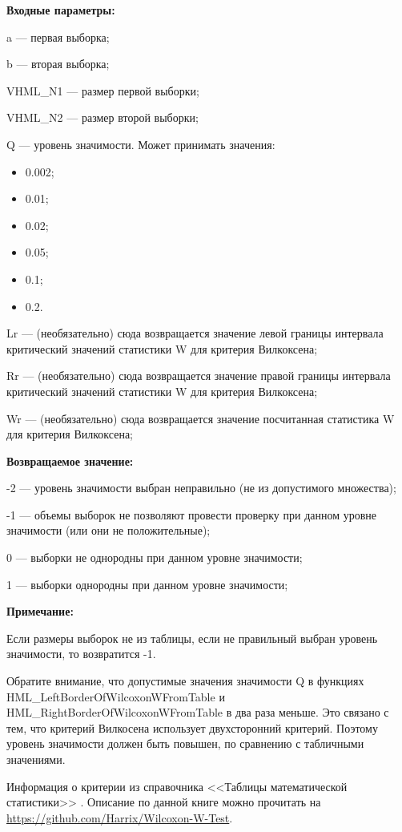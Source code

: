 \textbf{Входные параметры:}

 a --- первая выборка;
 
b --- вторая выборка;
 
VHML\_N1 --- размер первой выборки;
 
VHML\_N2 --- размер второй выборки;
 
Q --- уровень значимости. Может принимать значения:
	
\begin{itemize}
\item 0.002;
\item 0.01; 
\item 0.02; 
\item 0.05; 
\item 0.1; 
\item 0.2.
\end{itemize}

 Lr --- (необязательно) сюда возвращается значение левой границы интервала критический значений статистики W для критерия Вилкоксена;
 
 Rr --- (необязательно) сюда возвращается значение правой границы интервала критический значений статистики W для критерия Вилкоксена;
 
 Wr --- (необязательно) сюда возвращается значение посчитанная статистика W для критерия Вилкоксена; 

\textbf{Возвращаемое значение:}

 -2 --- уровень значимости выбран неправильно (не из допустимого множества);
 
 -1 --- объемы выборок не позволяют провести проверку при данном уровне значимости (или они не положительные);
 
 0 --- выборки не однородны  при данном уровне значимости;
 
 1 --- выборки однородны  при данном уровне значимости;

\textbf{Примечание:}

 Если размеры выборок не из таблицы, если не правильный выбран уровень значимости, то возвратится -1.
 
 Обратите внимание, что допустимые значения значимости Q в функциях HML\_LeftBorderOfWilcoxonWFromTable и HML\_RightBorderOfWilcoxonWFromTable в два раза меньше. Это связано с тем, что критерий Вилкосена использует двухсторонний критерий. Поэтому уровень значимости должен быть повышен, по сравнению с табличными значениями.
	 
 Информация о критерии из  справочника <<Таблицы математической статистики>> \cite[с. 93]{book:Bolshev1983}. Описание по данной книге можно прочитать на \href {https://github.com/Harrix/Wilcoxon-W-Test} {https://github.com/Harrix/Wilcoxon-W-Test}.
